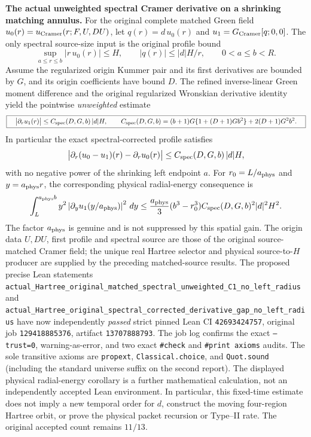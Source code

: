 \documentclass[11pt]{amsart}
\begin{document}
\medskip
\noindent\textbf{The actual unweighted spectral Cramer derivative on a
shrinking matching annulus.}
For the original complete matched Green field
\(u_0(r)=u_{\rm Cramer}(r;F,U,DU)\), let
\(q(r)=d\,u_0(r)\) and \(u_1=G_{\rm Cramer}[q;0,0]\).
The only spectral source-size input is the original profile bound
\[
 \sup_{a\le r\le b}|r\,u_0(r)|\le H,\qquad
 |q(r)|\le |d|H/r,\qquad 0<a\le b<R.
\]
Assume the regularized origin Kummer pair and its first derivatives are
bounded by \(G\), and its origin coefficients have bound \(D\).
The refined inverse-linear Green moment difference and the original
regularized Wronskian derivative identity yield the pointwise
\emph{unweighted} estimate
\[
 \boxed{\quad
 \big|\partial_r u_1(r)\big|
 \le C_{\rm spec}(D,G,b)\,|d|H,\qquad
 C_{\rm spec}(D,G,b)
 =(b+1)G\{1+(D+1)Gb^2\}+2(D+1)G^2b^2.
 \quad}
\]
In particular the exact spectral-corrected profile satisfies
\[
 \big|\partial_r(u_0-u_1)(r)-\partial_r u_0(r)\big|
 \le C_{\rm spec}(D,G,b)\,|d|H,
\]
with no negative power of the shrinking left endpoint \(a\).
For \(r_0=L/a_{\rm phys}\) and \(y=a_{\rm phys}r\), the
corresponding physical radial-energy consequence is
\[
 \int_L^{a_{\rm phys}b} y^2
 \left|\partial_y u_1(y/a_{\rm phys})\right|^2\,dy
 \le \frac{a_{\rm phys}}3(b^3-r_0^3)
       C_{\rm spec}(D,G,b)^2|d|^2H^2.
\]
The factor \(a_{\rm phys}\) is genuine and is not suppressed by this
spatial gain.  The origin data \(U,DU\), first profile and spectral source
are those of the original source-matched Cramer field; the unique real
Hartree selector and physical source-to-\(H\) producer are supplied by
the preceding matched-source results.  The proposed precise Lean
statements
\texttt{actual\_Hartree\_original\_matched\_spectral\_unweighted\_C1\_no\_left\_radius}
and
\texttt{actual\_Hartree\_original\_spectral\_corrected\_derivative\_gap\_no\_left\_radius}
have now independently \emph{passed} strict pinned Lean
CI \texttt{42693424757}, original job \texttt{129418885376},
artifact \texttt{13707888793}. The job log confirms the exact
\texttt{--trust=0}, warning-as-error, and two exact \texttt{\#check}
and \texttt{\#print axioms} audits. The sole transitive axioms are
\texttt{propext}, \texttt{Classical.choice}, and \texttt{Quot.sound}
(including the standard universe suffix on the second report).
The displayed physical radial-energy corollary is a further mathematical
calculation, not an independently accepted Lean environment.  In particular, this fixed-time
estimate does not imply a new temporal order for \(d\), construct the
moving four-region Hartree orbit, or prove the physical packet
recursion or Type--II rate. The original accepted count remains \(11/13\).
\end{document}
